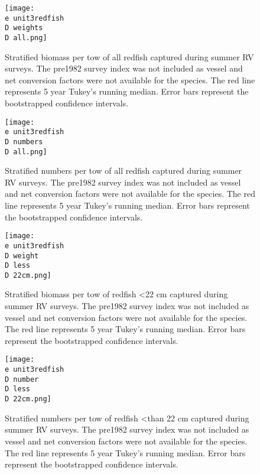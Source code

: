 \documentclass[11pt]{article}
\newcommand{\D}{.}
\newcommand{\e}{/home/ecomod_data/redfish/figures/}
\begin{document}
\begin{figure}
\centering
    
    \texttt{[image: \\e unit3redfish\\D weights\\D all.png]}
    \caption{Stratified biomass per tow of all redfish captured during summer RV surveys. The pre1982 survey index was not included as vessel and net conversion factors were not available for the species. The red line represents 5 year Tukey's running median. Error bars represent the bootstrapped confidence intervals.}

\end{figure}
\clearpage

\begin{figure}
\centering
    
    \texttt{[image: \\e unit3redfish\\D numbers\\D all.png]}
    \caption{Stratified numbers per tow of all redfish captured during summer RV surveys. The pre1982 survey index was not included as vessel and net conversion factors were not available for the species. The red line represents 5 year Tukey's running median. Error bars represent the bootstrapped confidence intervals.}

\end{figure}
\clearpage

\begin{figure}
\centering
    
    \texttt{[image: \\e unit3redfish\\D weight\\D less\\D 22cm.png]}
    \caption{Stratified biomass per tow of redfish \textless 22 cm captured during summer RV surveys. The pre1982 survey index was not included as vessel and net conversion factors were not available for the species. The red line represents 5 year Tukey's running median. Error bars represent the bootstrapped confidence intervals.}

\end{figure}
%
%
\begin{figure}
\centering
    
    \texttt{[image: \\e unit3redfish\\D number\\D less\\D 22cm.png]}
    \caption{Stratified numbers per tow of redfish \textless than 22 cm  captured during summer RV surveys. The pre1982 survey index was not included as vessel and net conversion factors were not available for the species. The red line represents 5 year Tukey's running median. Error bars represent the bootstrapped confidence intervals.}

\end{figure}
\clearpage
\end{document}
